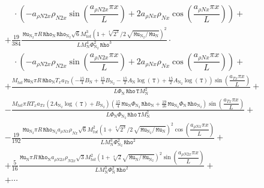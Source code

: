 \documentclass[10pt]{article}
\newcommand{\Rho}{\,\mathtt{Rho}}
\newcommand{\T}{\,\mathtt{T}}
\newcommand{\N}{\text{N}}
\newcommand{\Mu}{\, \mathtt{Mu}}
\begin{document}
\begin{equation}
\begin{split}
 &\quad \cdot \left(- a_{\rho N2 x} \rho_{N2 x} \sin\left(\dfrac{a_{\rho N2 x} \pi x}{L}\right) + 2 a_{\rho N x} \rho_{N x}
\cos\left(\dfrac{a_{\rho N x} \pi x}{L}\right)\right) +\\ 
%
&+ \frac{19}{384} \frac{\Mu_{\N_2} \pi R \Rho_{\N} \Rho_{\N_2} \sqrt{6} M_{tot}^{3} \left(1 + \sqrt[4]{2^3} / 2 \, \sqrt{
\Mu_{\N_2} / \Mu_{\N} }\right)^{2}}{L M_{\N}^{4} \Phi_{\N_2}^{2} \Rho^{3}} \cdot\\
 &\quad \cdot \left(- a_{\rho N2 x} \rho_{N2 x} \sin\left(\dfrac{a_{\rho N2 x} \pi x}{L}\right) + 2 a_{\rho N x} \rho_{N x}
\cos\left(\dfrac{a_{\rho N x} \pi x}{L}\right)\right) +\\ 
%
&+ \frac{M_{tot} \Mu_{\N} \pi R \Rho_{\N} T_{x} a_{Tx} \left(- \frac{15}{4} B_{\N} + \frac{15}{4} B_{\N_2} - \frac{15}{2} A_{\N}
\log(\T) + \frac{15}{2} A_{\N_2} \log(\T)\right) \sin\left(\dfrac{a_{Tx} \pi x}{L}\right)}{L \Phi_{\N} \Rho \T M_{\N}^{2}} +\\ 
%
&- \frac{M_{tot} \pi R T_{x} a_{Tx} ( 2 A_{\N_2} \log(\T)+B_{\N_2} ) \left(\frac{15}{4} \Mu_{\N} \Phi_{\N_2} \Rho_{\N} +
\frac{19}{16} \Mu_{\N_2} \Phi_{\N} \Rho_{\N_2}\right) \sin\left(\dfrac{a_{Tx} \pi x}{L}\right)}{L \Phi_{\N} \Phi_{\N_2} \Rho \T
M_{\N}^{2}} +\\ 
%
&- \frac{19}{192} \frac{\Mu_{\N_2} \pi R \Rho_{\N_2} a_{\rho N x} \rho_{N x} \sqrt{6} M_{tot}^{2} \left(1 + \sqrt[4]{2^3} / 2 \,
\sqrt{ \Mu_{\N_2} / \Mu_{\N} }\right)^{2} \cos\left(\dfrac{a_{\rho N x} \pi x}{L}\right)}{L M_{\N}^{3} \Phi_{\N_2}^{2} \Rho^{2}}
+\\ 
%
&+ \frac{5}{16} \frac{\Mu_{\N} \pi R \Rho_{\N} a_{\rho N2 x} \rho_{N2 x} \sqrt{3} M_{tot}^{2} \left(1 + \sqrt[4]{2} \sqrt{
\Mu_{\N} / \Mu_{\N_2} }\right)^{2} \sin\left(\dfrac{a_{\rho N2 x} \pi x}{L}\right)}{L M_{\N}^{3} \Phi_{\N}^{2} \Rho^{2}} +\\ 
%
&+\cdots \\
\end{split}
\end{equation}
\end{document}
